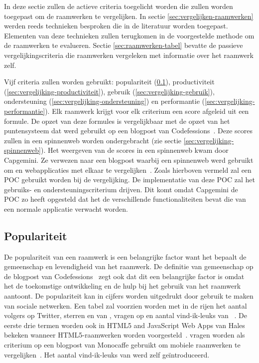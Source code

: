 In deze sectie zullen de actieve criteria toegelicht worden die zullen worden toegepast om de raamwerken te vergelijken.
In sectie \ref{sec:vergelijken-raamwerken} werden reeds technieken besproken die in de literatuur worden toegepast.
Elementen van deze technieken zullen terugkomen in de voorgestelde methode om de raamwerken te evalueren.
Sectie \ref{sec:raamwerken-tabel} bevatte de passieve vergelijkingscriteria die raamwerken vergeleken met informatie over het raamwerk zelf.

Vijf criteria zullen worden gebruikt: populariteit (\ref{sec:vergelijking-populariteit}), productiviteit (\ref{sec:vergelijking-productiviteit}), gebruik (\ref{sec:vergelijking-gebruik}), ondersteuning (\ref{sec:vergelijking-ondersteuning}) en performantie (\ref{sec:vergelijking-performantie}). 
Elk raamwerk krijgt voor elk criterium een score afgeleid uit een formule. 
De opzet van deze formules is vergelijkbaar met de opzet van het puntensysteem dat werd gebruikt op een blogpost van Codefessions~\cite{Sarrafi2012a}. 
Deze scores zullen in een spinnenweb worden ondergebracht (zie sectie \ref{sec:vergelijking-spinnenweb}).
Het weergeven van de scores in een spinnenweb kwam door Capgemini.
Ze verwezen naar een blogpost waarbij een spinnenweb werd gebruikt om  en webapplicaties met elkaar te vergelijken~\cite{Jeroen2012}.
Zoals hierboven vermeld zal een POC gebruikt worden bij de vergelijking.
De implementatie van deze POC zal het gebruiks- en ondersteuningscriterium drijven.  
Dit komt omdat Capgemini de POC zo heeft opgesteld dat het de verschillende functionaliteiten bevat die van een normale applicatie verwacht worden.

\subsection{Populariteit}
\label{sec:vergelijking-populariteit}
De populariteit van een raamwerk is een belangrijke factor want het bepaalt de gemeenschap en levendigheid van het raamwerk.
De definitie van gemeenschap op de blogpost van Codefessions~\cite{Sarrafi2012a} zegt ook dat dit een belangrijke factor is omdat het de toekomstige ontwikkeling en de hulp bij het gebruik van het raamwerk aantoont. 
De populariteit kan in cijfers worden uitgedrukt door gebruik te maken van sociale netwerken. 
Een tabel zal voorzien worden met in de rijen het aantal volgers op Twitter, sterren en  van \gh{},  vragen op \so{} en aantal vind-ik-leuks van \fb{}~\cite{Hales2012,Ayuso2012}.
De eerste drie termen worden ook in HTML5 and JavaScript Web Apps van Hales bekeken wanneer HTML5-raamwerken worden voorgesteld~\cite{Hales2012}.
\so{} vragen worden als criterium op een blogpost van Monocaffe gebruikt om mobiele raamwerken te vergelijken~\cite{Ayuso2012}.  
Het aantal vind-ik-leuks van \fb{} werd zelf geïntroduceerd.

